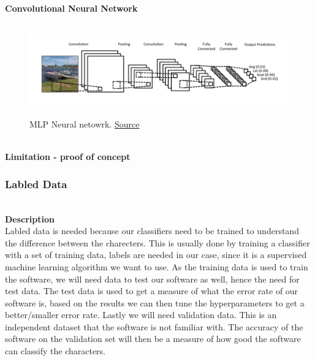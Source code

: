 \documentclass[11pt,a4paper,english]{article}
\begin{document}
\noindent \\ \textbf{Convolutional Neural Network}
\begin{figure}[H]
  \centering
  \includegraphics[height=4cm]{res/CNN_architecture.png}
  \caption{MLP Neural netowrk. \href{ http://www.wildml.com/2015/11/understanding-convolutional-neural-networks-for-nlp/}{Source}}
  \label{fig:CNN_architecture}
\end{figure}




\noindent \\ \textbf{Limitation - proof of concept}

\subsubsection{Labled Data}
\noindent \\ \textbf{Description}
\noindent \\
Labled data is needed because our classifiers need to be trained to understand
the difference between the charecters. This is usually done by training a
classifier with a set of training data, labels are needed in our case,
since it is a supervised machine learning algorithm we want to use. As the
training data is used to train the software, we will need data to test our
software as well, hence the need for test data. The test data is used to get a
measure of what the error rate of our software is, based on the results we
can then tune the hyperparameters to get a better/smaller error rate. Lastly
we will need validation data. This is an independent dataset that the software
is not familiar with. The accuracy of the software on the validation set will
then be a measure of how good the software can classify the characters.
\end{document}
